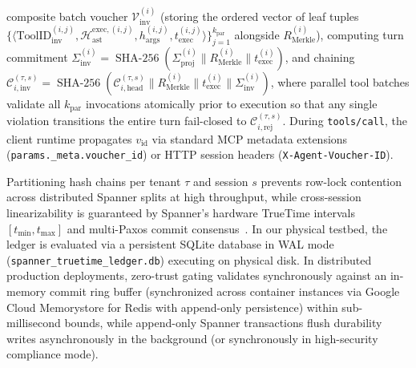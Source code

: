 \documentclass[conference,10pt]{IEEEtran}
\begin{document}
composite batch voucher $\mathcal{V}_{\text{inv}}^{(i)}$ (storing the ordered vector of leaf tuples $\{\langle \text{ToolID}_{\text{inv}}^{(i,j)}, \mathcal{H}_{\text{ast}}^{\text{exec},(i,j)}, h_{\text{args}}^{(i,j)}, t_{\text{exec}}^{(i,j)} \rangle\}_{j=1}^{k_{\text{par}}}$ alongside $R_{\text{Merkle}}^{(i)}$), computing turn commitment $\Sigma_{\text{inv}}^{(i)} = \operatorname{SHA-256}(\Sigma_{\text{proj}}^{(i)} \parallel R_{\text{Merkle}}^{(i)} \parallel t_{\text{exec}}^{(i)})$, and chaining $\mathcal{C}_{i,\text{inv}}^{(\tau, s)} = \operatorname{SHA-256}(\mathcal{C}_{i,\text{head}}^{(\tau, s)} \parallel R_{\text{Merkle}}^{(i)} \parallel t_{\text{exec}}^{(i)} \parallel \Sigma_{\text{inv}}^{(i)})$, where parallel tool batches validate all $k_{\text{par}}$ invocations atomically prior to execution so that any single violation transitions the entire turn fail-closed to $\mathcal{C}_{i,\text{rej}}^{(\tau, s)}$. During \texttt{tools/call}, the client runtime propagates $v_{\text{id}}$ via standard MCP metadata extensions (\texttt{params.\_meta.voucher\_id}) or HTTP session headers (\texttt{X-Agent-Voucher-ID}).

Partitioning hash chains per tenant $\tau$ and session $s$ prevents row-lock contention across distributed Spanner splits at high throughput, while cross-session linearizability is guaranteed by Spanner's hardware TrueTime intervals $[t_{\min}, t_{\max}]$ and multi-Paxos commit consensus~\cite{corbett2013spanner, lamport1978time}. In our physical testbed, the ledger is evaluated via a persistent SQLite database in WAL mode (\texttt{spanner\_truetime\_ledger.db}) executing on physical disk. In distributed production deployments, zero-trust gating validates synchronously against an in-memory commit ring buffer (synchronized across container instances via Google Cloud Memorystore for Redis with append-only persistence) within sub-millisecond bounds, while append-only Spanner transactions flush durability writes asynchronously in the background (or synchronously in high-security compliance mode).
\end{document}
